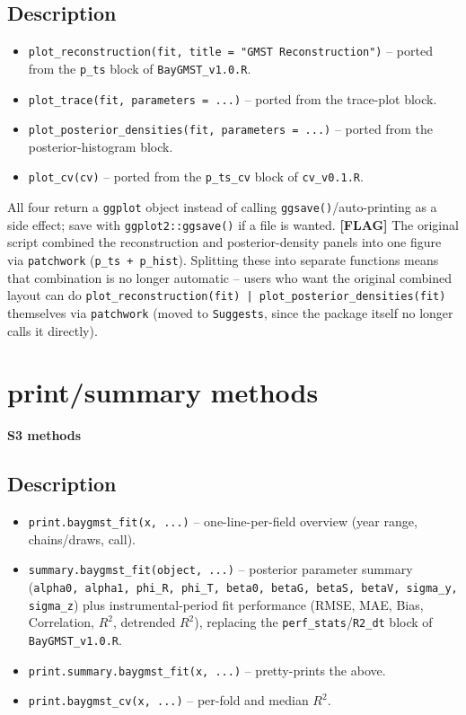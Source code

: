 \documentclass[10pt]{article}
\newcommand{\flag}[1]{\textcolor{gaporange}{\textbf{[FLAG]} #1}}
\newcommand{\rdtopic}[1]{\clearpage\section{#1}}
\newcommand{\rdsub}[1]{\subsection*{#1}}
\begin{document}
\rdsub{Description}
\begin{itemize}
\item \texttt{plot\_reconstruction(fit, title = "GMST Reconstruction")} --
  ported from the \texttt{p\_ts} block of \texttt{BayGMST\_v1.0.R}.
\item \texttt{plot\_trace(fit, parameters = ...)} -- ported from the
  trace-plot block.
\item \texttt{plot\_posterior\_densities(fit, parameters = ...)} -- ported
  from the posterior-histogram block.
\item \texttt{plot\_cv(cv)} -- ported from the \texttt{p\_ts\_cv} block of
  \texttt{cv\_v0.1.R}.
\end{itemize}
All four return a \texttt{ggplot} object instead of calling
\texttt{ggsave()}/auto-printing as a side effect; save with
\texttt{ggplot2::ggsave()} if a file is wanted.
\flag{The original script combined the reconstruction and posterior-density
panels into one figure via \texttt{patchwork} (\texttt{p\_ts + p\_hist}).
Splitting these into separate functions means that combination is no
longer automatic -- users who want the original combined layout can do
\texttt{plot\_reconstruction(fit) | plot\_posterior\_densities(fit)}
themselves via \texttt{patchwork} (moved to \texttt{Suggests}, since the
package itself no longer calls it directly).}

\rdtopic{print/summary methods}
\textbf{S3 methods}

\rdsub{Description}
\begin{itemize}
\item \texttt{print.baygmst\_fit(x, ...)} -- one-line-per-field overview
  (year range, chains/draws, call).
\item \texttt{summary.baygmst\_fit(object, ...)} -- posterior parameter
  summary (\texttt{alpha0, alpha1, phi\_R, phi\_T, beta0, betaG, betaS,
  betaV, sigma\_y, sigma\_z}) plus instrumental-period fit performance
  (RMSE, MAE, Bias, Correlation, $R^2$, detrended $R^2$), replacing the
  \texttt{perf\_stats}/\texttt{R2\_dt} block of \texttt{BayGMST\_v1.0.R}.
\item \texttt{print.summary.baygmst\_fit(x, ...)} -- pretty-prints the
  above.
\item \texttt{print.baygmst\_cv(x, ...)} -- per-fold and median $R^2$.
\end{itemize}

\clearpage
\end{document}
